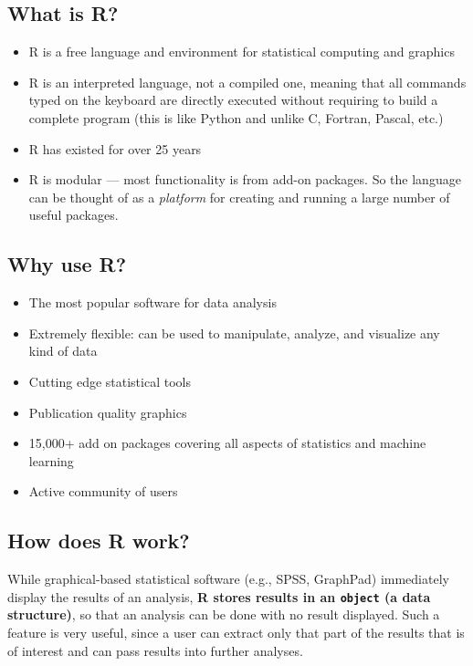 \documentclass[
]{book}
\providecommand{\tightlist}{%
  \setlength{\itemsep}{0pt}\setlength{\parskip}{0pt}}
\begin{document}
\hypertarget{what-is-r}{%
\subsection{What is R?}\label{what-is-r}}

\begin{itemize}
\tightlist
\item
  R is a free language and environment for statistical computing and graphics
\item
  R is an interpreted language, not a compiled one, meaning that all commands
  typed on the keyboard are directly executed without requiring to build a complete
  program (this is like Python and unlike C, Fortran, Pascal, etc.)
\item
  R has existed for over 25 years
\item
  R is modular --- most functionality is from add-on packages. So the language can
  be thought of as a \emph{platform} for creating and running a large number of useful packages.
\end{itemize}

\hypertarget{why-use-r}{%
\subsection{Why use R?}\label{why-use-r}}

\begin{itemize}
\tightlist
\item
  The most popular software for data analysis
\item
  Extremely flexible: can be used to manipulate, analyze, and visualize
  any kind of data
\item
  Cutting edge statistical tools
\item
  Publication quality graphics
\item
  15,000+ add on packages covering all aspects of statistics and machine learning
\item
  Active community of users
\end{itemize}

\hypertarget{how-does-r-work}{%
\subsection{How does R work?}\label{how-does-r-work}}

While graphical-based statistical software (e.g., SPSS, GraphPad) immediately display
the results of an analysis, \textbf{R stores results in an \texttt{object} (a data structure)},
so that an analysis can be done with no result displayed. Such a feature is very
useful, since a user can extract only that part of the results that is of interest
and can pass results into further analyses.
\end{document}
